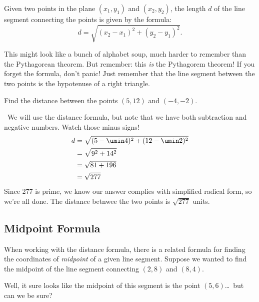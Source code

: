 \begin{boxeddef}
Given two points in the plane $(x_1, y_1)$ and $(x_2, y_2)$, the length $d$ of the line segment connecting the points is given by the formula:
\[d = \sqrt{ (x_2 - x_1)^2 + (y_2 - y_1)^2 }.\]
\end{boxeddef}

This might look like a bunch of alphabet soup, much harder to remember than the Pythagorean theorem. But remember: this \textit{is} the Pythagorem theorem! If you forget the formula, don't panic! Just remember that the line segment between the two points is the hypotenuse of a right triangle.

\begin{boxedex}
Find the distance between the points $(5, 12)$ and $(-4, -2)$.

\exsoln\ We will use the distance formula, but note that we have both subtraction and negative numbers. Watch those minus signs!
\[\begin{aligned}
d &= \sqrt{ (5 - \umin4)^2 + (12 - \umin2)^2 } \\
&= \sqrt{ 9^2 + 14^2 } \\
&=\sqrt{ 81 + 196 } \\
&=\sqrt{ 277 }
\end{aligned}\]
Since 277 is prime, we know our answer complies with simplified radical form, so we're all done. The distance betnwee the two points is $\sqrt{277}$ units.
\end{boxedex}

\subsection{Midpoint Formula}

When working with the distance formula, there is a related formula for finding the coordinates of \textit{midpoint} of a given line segment. Suppose we wanted to find the midpoint of the line segment connecting $(2,8)$ and $(8,4)$.
\begin{center}
\end{center}
Well, it sure looks like the midpoint of this segment is the point $(5,6)$\ldots\ but can we be sure?

